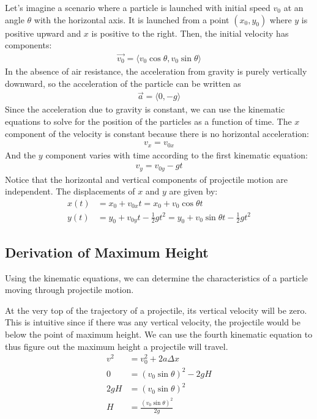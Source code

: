 \documentclass[11pt]{article}
\begin{document}
Let's imagine a scenario where a particle is launched with initial speed $v_{0}$ at an angle $\theta$ with the horizontal axis. It is launched from a point $(x_{0}, y_{0})$ where $y$ is positive upward and $x$ is positive to the right. Then, the initial velocity has components:
\begin{align*}
    \Vec{v_{0}} = \langle v_{0}\cos{\theta}, v_{0}\sin{\theta} \rangle
\end{align*}
In the absence of air resistance, the acceleration from gravity is purely vertically downward, so the acceleration of the particle can be written as
\begin{align*}
    \Vec{a} = \langle 0, -g \rangle
\end{align*}
Since the acceleration due to gravity is constant, we can use the kinematic equations to solve for the position of the particles as a function of time. The $x$ component of the velocity is constant because there is no horizontal acceleration:
\begin{align*}
    v_{x} = v_{0x}
\end{align*}
And the $y$ component varies with time according to the first kinematic equation:
\begin{align*}
    v_{y} = v_{0y} - gt
\end{align*}
Notice that the horizontal and vertical components of projectile motion are independent. The displacements of $x$ and $y$ are given by:
\begin{align*}
    x(t) &= x_{0} + v_{0x}t = x_{0} + v_{0}\cos{\theta}t\\
    y(t) &= y_{0} + v_{0y}t - \frac{1}{2}gt^{2} = y_{0} + v_{0}\sin{\theta}t - \frac{1}{2}gt^{2}
\end{align*}


\subsection{Derivation of Maximum Height}

Using the kinematic equations, we can determine the characteristics of a particle moving through projectile motion. 

At the very top of the trajectory of a projectile, its vertical velocity will be zero. This is intuitive since if there was any vertical velocity, the projectile would be below the point of maximum height. We can use the fourth kinematic equation to thus figure out the maximum height a projectile will travel.
\begin{align*}
    v^{2} &= v_0^{2} + 2a\Delta x \\
    0 &= (v_{0}\sin{\theta})^2 - 2gH \\
    2gH &= (v_{0}\sin{\theta})^2 \\
    H &= \frac{(v_{0}\sin{\theta})^2}{2g}
\end{align*}
\end{document}
